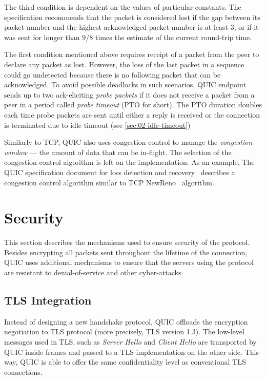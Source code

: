 The third condition is dependent on the values of particular constants. The specification recommends
that the packet is considered lost if the gap between its packet number and the highest acknowledged
packet number is at least 3, or if it was sent for longer than $9/8$ times the estimate of the
current round-trip time.

The first condition mentioned above requires receipt of a packet from the peer to declare any packet
as lost. However, the loss of the last packet in a sequence could go undetected because there is no
following packet that can be acknowledged. To avoid possible deadlocks in such scenarios, QUIC
endpoint sends up to two ack-eliciting \textit{probe packets} if it does not receive a packet from a
peer in a period called \textit{probe timeout} (PTO for short). The PTO duration doubles each time
probe packets are sent until either a reply is received or the connection is terminated due to idle
timeout (see \autoref{sec:02-idle-timeout})

Similarly to TCP, QUIC also uses congestion control to manage the \textit{congestion window} --- the
amount of data that can be in-flight. The selection of the congestion control algorithm is left on
the implementation. As an example, The QUIC specification document for loss detection and recovery~\cite[Section~7]{draft-ietf-quic-recovery} describes a congestion control algorithm similar to TCP NewReno~\cite{rfc6582} algorithm.

\section{Security}

This section describes the mechanisms used to ensure security of the protocol. Besides encrypting
all packets sent throughout the lifetime of the connection, QUIC uses additional mechanisms to
ensure that the servers using the protocol are resistant to denial-of-service and other
cyber-attacks.

\subsection{TLS Integration}

Instead of designing a new handshake protocol, QUIC offloads the encryption negotiation to TLS
protocol (more precisely, TLS version 1.3). The low-level messages used in TLS, such as
\textit{Server Hello} and \textit{Client Hello} are transported by QUIC inside \CRYPTO{} frames and
passed to a TLS implementation on the other side. This way, QUIC is able to offer the same
confidentiality level as conventional TLS connections.

